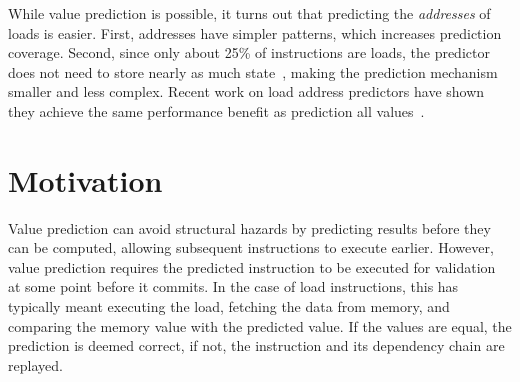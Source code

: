 \documentclass{sig-alternate}
\begin{document}
While value prediction is possible, it turns out that predicting the \textit{addresses} of loads is easier. First, addresses have simpler patterns, which increases prediction coverage. Second, since only about 25\% of instructions are loads, the predictor does not need to store nearly as much state~\cite{AVPP/orosa18}, making the prediction mechanism smaller and less complex. Recent work on load address predictors have shown they achieve the same performance benefit as prediction all values~\cite{DLVP/sheikh17, AVPP/orosa18}.
































\section{Motivation}
\label{sec:motivation}

Value prediction can avoid structural hazards by predicting results before they can be computed, allowing subsequent instructions to execute earlier. However, value prediction requires the predicted instruction to be executed for validation at some point before it commits. In the case of load instructions, this has typically meant executing the load, fetching the data from memory, and comparing the memory value with the predicted value. If the values are equal, the prediction is deemed correct, if not, the instruction and its dependency chain are replayed. 
\end{document}
